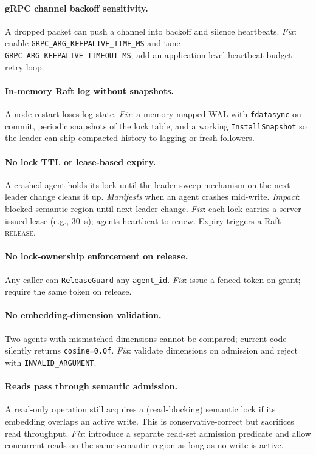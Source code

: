 \documentclass[sigconf]{acmart}
\begin{document}
\paragraph{gRPC channel backoff sensitivity.} A dropped packet can
push a channel into backoff and silence heartbeats. \emph{Fix}: enable
\texttt{GRPC\_ARG\_KEEPALIVE\_TIME\_MS} and tune
\texttt{GRPC\_ARG\_KEEPALIVE\_TIMEOUT\_MS}; add an application-level
heartbeat-budget retry loop.

\paragraph{In-memory Raft log without snapshots.} A node restart
loses log state. \emph{Fix}: a memory-mapped WAL with
\texttt{fdatasync} on commit, periodic snapshots of the lock table,
and a working \texttt{InstallSnapshot} so the leader can ship
compacted history to lagging or fresh followers.

\paragraph{No lock TTL or lease-based expiry.} A crashed agent
holds its lock until the leader-sweep mechanism on the next leader
change cleans it up. \emph{Manifests} when an agent crashes mid-write.
\emph{Impact}: blocked semantic region until next leader change.
\emph{Fix}: each lock carries a server-issued lease (e.g., 30~s);
agents heartbeat to renew. Expiry triggers a Raft \textsc{release}.

\paragraph{No lock-ownership enforcement on release.} Any caller can
\texttt{ReleaseGuard} any \texttt{agent\_id}. \emph{Fix}: issue a
fenced token on grant; require the same token on release.

\paragraph{No embedding-dimension validation.} Two agents with
mismatched dimensions cannot be compared; current code silently returns
\texttt{cosine=0.0f}. \emph{Fix}: validate dimensions on admission and
reject with \texttt{INVALID\_ARGUMENT}.

\paragraph{Reads pass through semantic admission.} A read-only
operation still acquires a (read-blocking) semantic lock if its
embedding overlaps an active write. This is conservative-correct but
sacrifices read throughput. \emph{Fix}: introduce a separate read-set
admission predicate and allow concurrent reads on the same semantic
region as long as no write is active.
\end{document}
